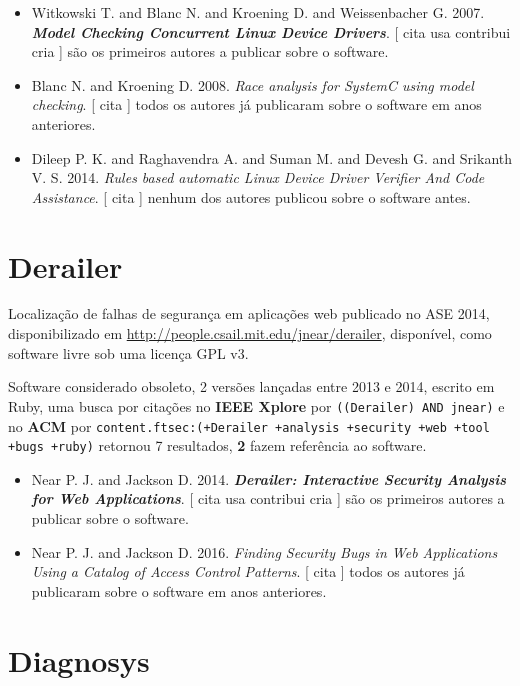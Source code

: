 \begin{itemize}
\item Witkowski T. and Blanc N. and Kroening D. and Weissenbacher G.
      2007.
        \textbf{\textit{ Model Checking Concurrent Linux Device Drivers}}.
      [
          cita
          usa
          contribui
          cria
      ]
são os primeiros autores a publicar sobre o software.
\item Blanc N. and Kroening D.
      2008.
        \textit{ Race analysis for SystemC using model checking}.
      [
          cita
      ]
todos os autores já publicaram sobre o software em anos anteriores.
\item Dileep P. K. and Raghavendra A. and Suman M. and Devesh G. and Srikanth V. S.
      2014.
        \textit{ Rules based automatic Linux Device Driver Verifier And Code Assistance}.
      [
          cita
      ]
nenhum dos autores publicou sobre o software antes.
\end{itemize}
\section{Derailer}

Localização de falhas de segurança em aplicações web
publicado no ASE 2014,
disponibilizado em \url{http://people.csail.mit.edu/jnear/derailer},
disponível,
como software livre
sob uma licença GPL v3.

Software considerado obsoleto,
2 versões lançadas
entre 2013 e 2014,
escrito em Ruby,
uma busca por citações no {\bf IEEE Xplore} por
\texttt{((Derailer) AND jnear)}
e no {\bf ACM} por
\texttt{content.ftsec:(+Derailer +analysis +security +web +tool +bugs +ruby)}
retornou
7 resultados,
{\bf 2} fazem referência ao software.

\begin{itemize}
\item Near P. J. and Jackson D.
      2014.
        \textbf{\textit{ Derailer: Interactive Security Analysis for Web Applications}}.
      [
          cita
          usa
          contribui
          cria
      ]
são os primeiros autores a publicar sobre o software.
\item Near P. J. and Jackson D.
      2016.
        \textit{ Finding Security Bugs in Web Applications Using a Catalog of Access Control Patterns}.
      [
          cita
      ]
todos os autores já publicaram sobre o software em anos anteriores.
\end{itemize}
\section{Diagnosys}

